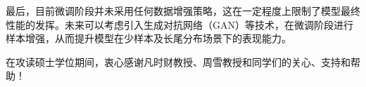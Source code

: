 \documentclass[master]{thesis-uestc}
\begin{document}
最后，目前微调阶段并未采用任何数据增强策略，这在一定程度上限制了模型最终性能的发挥。未来可以考虑引入生成对抗网络（GAN）等技术，在微调阶段进行样本增强，从而提升模型在少样本及长尾分布场景下的表现能力。

\thesisacknowledgement
在攻读硕士学位期间，衷心感谢凡时财教授、周雪教授和同学们的关心、支持和帮助！

\thesisappendix



%
% 
%
% 
% 
%

\end{document}
